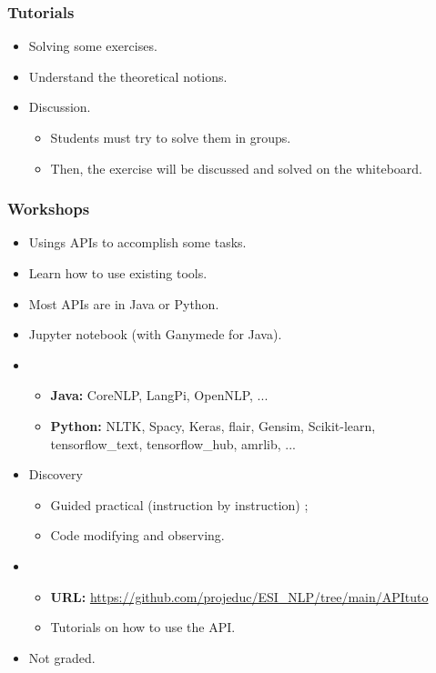 \documentclass{beamer}
\begin{document}
\begin{frame}
	\frametitle{Tutorials}
	
	\begin{itemize}
		\item Solving some exercises.
		\item {} Understand the theoretical notions.
		\item {} Discussion.
		\begin{itemize}
			\item Students must try to solve them in groups.
			\item Then, the exercise will be discussed and solved on the whiteboard.
		\end{itemize}
	\end{itemize}
	
\end{frame}

\begin{frame}
	\frametitle{Workshops}
	
	\begin{itemize}
		\item Usings APIs to accomplish some tasks.
		\item {} Learn how to use existing tools.
		\item {} Most APIs are in Java or Python.
		\item {} Jupyter notebook (with Ganymede for Java).
		\item {} 
		\begin{itemize}
			\item \textbf{Java:} CoreNLP, LangPi, OpenNLP, ...
			\item \textbf{Python:} NLTK, Spacy, Keras, flair, Gensim, Scikit-learn, tensorflow\_text, tensorflow\_hub, amrlib, ...
		\end{itemize}
		\item {} Discovery
		\begin{itemize}
			\item Guided practical (instruction by instruction) ; 
			\item Code modifying and observing.
		\end{itemize}
		\item {}
		\begin{itemize}
			\item \textbf{URL:} {\scriptsize\url{https://github.com/projeduc/ESI_NLP/tree/main/APItuto}}
			\item Tutorials on how to use the API.
		\end{itemize}
		\item Not graded.
	\end{itemize}
	
\end{frame}
\end{document}
